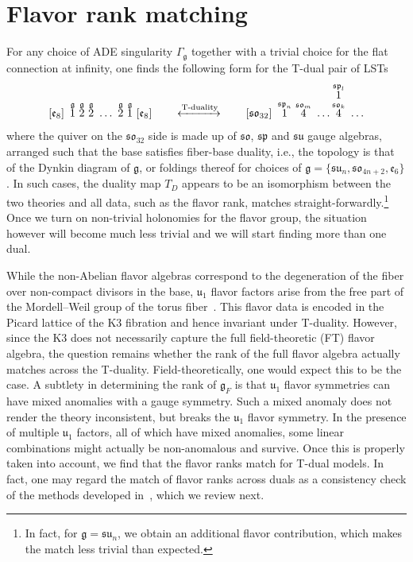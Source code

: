 \documentclass[11pt]{article}
\numberwithin{equation}{section}
\newcommand\myoverset[2]{\overset{\textstyle #1\mathstrut}{#2}}
\newcommand{\fu}{\mathfrak{u}}
\newcommand{\fsu}{\mathfrak{su}}
\newcommand{\fso}{\mathfrak{so}}
\newcommand{\fg}{\mathfrak{g}}
\newcommand{\fe}{\mathfrak{e}}
\begin{document}
\section{Flavor rank matching}
\label{sec:flavmatch}
For any choice of ADE singularity $\Gamma_\mathfrak{g}$ together with a trivial choice for the flat connection at infinity, one finds the following form for the T-dual pair of LSTs~\cite{Aspinwall:1996vc}
\begin{align}
\lbrack  \mathfrak{e}_{8}\rbrack     \, \
\overset{\fg}{1} \, \,
\overset{\fg}{2}\, \,\overset{\fg}{2}\, \,
\ldots\, \, \overset{\fg}{2}\, \, \overset{\fg}{1} \, \, 
\lbrack \mathfrak{e}_{8} \rbrack
%
\qquad\xleftrightarrow{\text{T-duality}}\qquad
%
\lbrack  \mathfrak{so}_{32}\rbrack     \, \
{\overset{\mathfrak{sp}_{n}}{1}}  \, \,
{\overset{\mathfrak{so}_{m}}{4}}  \, \,
\dots
\myoverset{{\overset{\mathfrak{sp}_{l}}{1}}}
{\overset{\mathfrak{so}_{k}}{4}}  \, \,
\dots
\end{align}
where the quiver on the $\mathfrak{so}_{32}$ side is made up of $\mathfrak{so}$, $\mathfrak{sp}$ and $\fsu$ gauge algebras, arranged such that the base satisfies fiber-base duality, i.e., the topology is that of the Dynkin diagram of $\mathfrak{g}$, or foldings thereof \cite{Intriligator:1997dh} for choices of $\fg=\{ \fsu_n, \fso_{4n+2}, \fe_6 \}$. In such cases, the duality map $T_D$ appears to be an isomorphism between the two theories and all data, such as the flavor rank, matches straight-forwardly.\footnote{In fact, for $\fg=\fsu_n$, we obtain an additional flavor contribution, which makes the match less trivial than expected.} Once we turn on non-trivial holonomies for the flavor group, the situation however will become much less trivial and we will start finding more than one dual. 

While the non-Abelian flavor algebras correspond to the degeneration of the fiber over non-compact divisors in the base, $\fu_1$ flavor factors arise from the free part of the Mordell–Weil group of the torus fiber~\cite{Lee:2018ihr}. This flavor data is encoded in the Picard lattice of the K3 fibration and hence invariant under T-duality. However, since the K3 does not necessarily capture the full field-theoretic (FT) flavor algebra, the question remains whether the rank of the full flavor algebra actually matches across the T-duality. Field-theoretically, one would expect this to be the case. A subtlety in determining the rank of $\fg_F$ is that $\fu_1$ flavor symmetries can have mixed anomalies with a gauge symmetry. Such a mixed anomaly does not render the theory inconsistent, but breaks the $\fu_1$ flavor symmetry. In the presence of multiple $\fu_1$ factors, all of which have mixed anomalies, some linear combinations might actually be non-anomalous and survive. Once this is properly taken into account, we find that the flavor ranks match for T-dual models. In fact, one may regard the match of flavor ranks across duals as a consistency check of the methods developed in~\cite{Fazzi:2020}, which we review next. 
\end{document}

